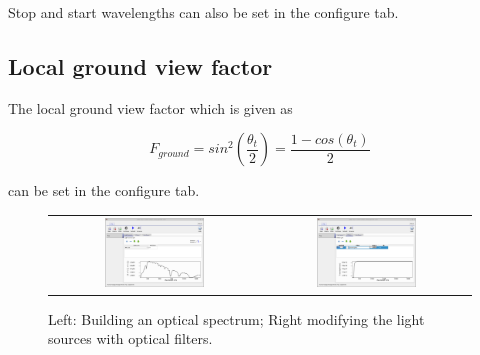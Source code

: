 Stop and start wavelengths can also be set in the configure tab.

\subsection{Local ground view factor}
The local ground view factor which is given as \cite{neryterrain}

\begin{equation}
F_{ground}=sin^2 \left ( \frac{\theta_t}{2}\right )=\frac{1-cos(\theta_t)}{2}
\end{equation}

can be set in the configure tab.

\begin{figure}[H]
\centering
\begin{tabular}{ c c }

\includegraphics[width=0.5\textwidth,height=0.4\textwidth]{./images/lights0.png}

&
\includegraphics[width=0.5\textwidth,height=0.4\textwidth]{./images/lights1.png}
\\
\end{tabular}
\caption{Left: Building an optical spectrum; Right modifying the light sources with optical filters.}
\label{fig:lightsourceeditor}
\end{figure}


